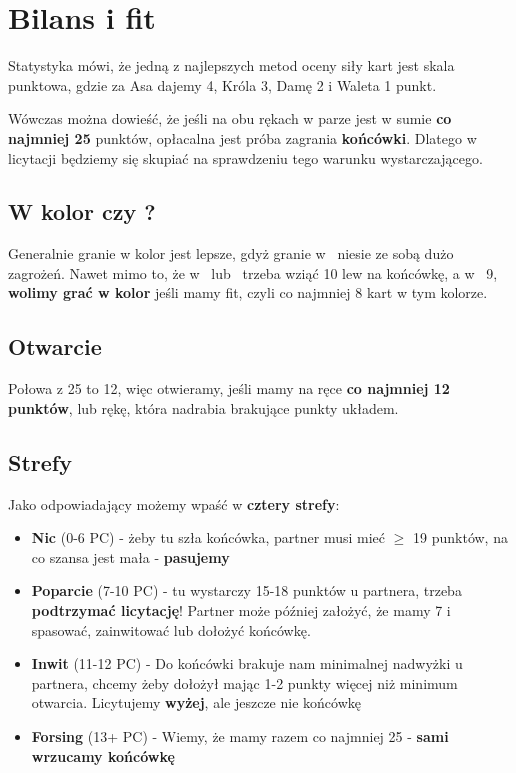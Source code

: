 \documentclass[12pt, a4paper]{article}
\begin{document}
    \pagebreak
    \section{Bilans i fit}

    Statystyka mówi, że jedną z najlepszych metod oceny siły kart jest skala punktowa,
    gdzie za Asa dajemy 4, Króla 3, Damę 2 i Waleta 1 punkt. 
    
    Wówczas można dowieść, że jeśli na obu rękach w parze jest w sumie \textbf{co najmniej 25} punktów,
    opłacalna jest próba zagrania \textbf{końcówki}. Dlatego w licytacji będziemy
    się skupiać na sprawdzeniu tego warunku wystarczającego.

    \subsection{W kolor czy \ntx?}
    Generalnie granie w kolor jest lepsze, gdyż granie w \nt\ niesie ze sobą dużo zagrożeń.
    Nawet mimo to, że w \hearts\ lub \spades\ trzeba wziąć 10 lew na końcówkę, a w \nt\ 9,
    \textbf{wolimy grać w kolor} jeśli mamy fit, czyli co najmniej 8 kart w tym kolorze.

    \subsection{Otwarcie}
    Połowa z 25 to 12, więc otwieramy, jeśli mamy na ręce \textbf{co najmniej 12 punktów},
    lub rękę, która nadrabia brakujące punkty układem.

    \subsection{Strefy}
    Jako odpowiadający możemy wpaść w \textbf{cztery strefy}:
    \begin{itemize}
        \item \color{Periwinkle}\textbf{Nic} \color{black} (0-6 PC) - żeby tu szła końcówka, partner musi mieć $\geq$ 19 punktów,
        na co szansa jest mała - \textbf{pasujemy}
        \item \color{Emerald}\textbf{Poparcie} \color{black}(7-10 PC)
         - tu wystarczy 15-18 punktów u partnera, trzeba \textbf{podtrzymać licytację}! 
         Partner może później założyć, że mamy 7 i spasować, zainwitować lub dołożyć końcówkę.
        \item \color{YellowOrange}\textbf{Inwit} \color{black} (11-12 PC) - 
        Do końcówki brakuje nam minimalnej nadwyżki u partnera, chcemy żeby dołożył
        mając 1-2 punkty więcej niż minimum otwarcia. Licytujemy \textbf{wyżej}, ale jeszcze nie końcówkę
        \item \color{BrickRed}\textbf{Forsing} \color{black}(13+ PC) - Wiemy, że mamy razem 
        co najmniej 25 - \textbf{sami wrzucamy końcówkę}
    \end{itemize}
\end{document}

